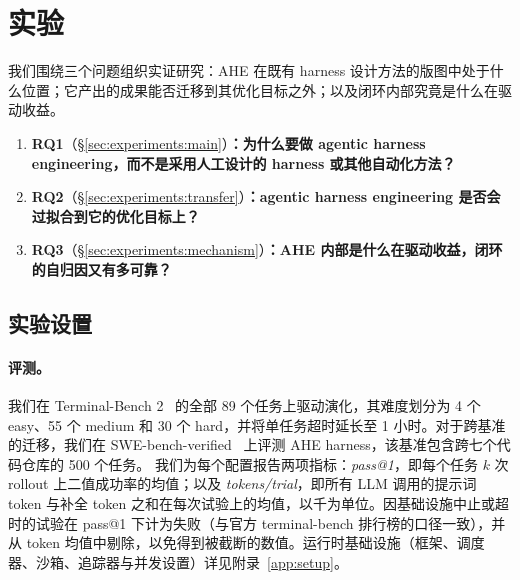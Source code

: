 \section{实验}
\label{sec:experiments}

我们围绕三个问题组织实证研究：AHE 在既有 harness 设计方法的版图中处于什么位置；它产出的成果能否迁移到其优化目标之外；以及闭环内部究竟是什么在驱动收益。

\begin{tcolorbox}[
    colback=blue!3,
    colframe=blue!40,
    arc=2pt,
    boxrule=0.5pt,
    left=6pt, right=6pt, top=4pt, bottom=4pt,
    title={\textbf{研究问题}},
    fonttitle=\bfseries,
    coltitle=black,
    colbacktitle=blue!10
  ]
  \begin{enumerate}
    \setlength{\leftmargini}{1.5em}
    \setlength{\itemsep}{2pt}
    \setlength{\parsep}{0pt}
      \item \textbf{RQ1}（\S\ref{sec:experiments:main}）\textbf{：为什么要做 agentic harness engineering，而不是采用人工设计的 harness 或其他自动化方法？}
      \item \textbf{RQ2}（\S\ref{sec:experiments:transfer}）\textbf{：agentic harness engineering 是否会过拟合到它的优化目标上？}
      \item \textbf{RQ3}（\S\ref{sec:experiments:mechanism}）\textbf{：AHE 内部是什么在驱动收益，闭环的自归因又有多可靠？}
  \end{enumerate}
\end{tcolorbox}

\subsection{实验设置}
\label{sec:experiments:setup}

\paragraph{评测。}
\label{sec:experiments:metrics}
我们在 Terminal-Bench 2~\citep{merrillTerminalBenchBenchmarkingAgents2026a} 的全部 89 个任务上驱动演化，其难度划分为 4 个 easy、55 个 medium 和 30 个 hard，并将单任务超时延长至 1 小时。对于跨基准的迁移，我们在 SWE-bench-verified~\citep{jimenezSWEbenchCanLanguage2023} 上评测 AHE harness，该基准包含跨七个代码仓库的 500 个任务。
我们为每个配置报告两项指标：\textit{pass@1}，即每个任务 $k$ 次 rollout 上二值成功率的均值；以及 \textit{tokens/trial}，即所有 LLM 调用的提示词 token 与补全 token 之和在每次试验上的均值，以千为单位。因基础设施中止或超时的试验在 pass@1 下计为失败（与官方 terminal-bench 排行榜的口径一致），并从 token 均值中剔除，以免得到被截断的数值。运行时基础设施（框架、调度器、沙箱、追踪器与并发设置）详见附录~\ref{app:setup}。

